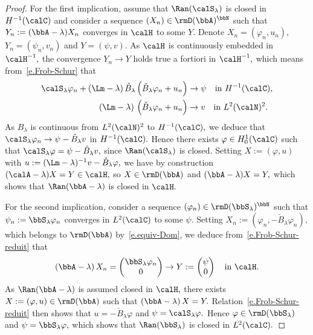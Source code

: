 \begin{proof}
For the first implication, assume that $\Ran(\calS_\lambda)$ is closed in $H^{-1}(\calC)$ and consider a sequence $(X_n) \in \rmD(\bbA)^\bbN$ such that $Y_n := (\bbA-\lambda) X_n$ converges in $\calH$ to some $Y.$ Denote $X_n = (\varphi_n,u_n),$ $Y_n = (\psi_n,v_n)$ and $Y = (\psi,v).$ As $\calH$ is continuously embedded in $\calH^{-1},$ the convergence $Y_n \to Y$ holds true a fortiori in $\calH^{-1},$ which means from~\eqref{e.Frob-Schur} that
\begin{align*}
\calS_\lambda \varphi_n + (\Lm - \lambda)\, \hat{B}_\lambda\left(\check{B}_\lambda \varphi_n + u_n\right) & \to \psi \quad\text{in } H^{-1}(\calC), \\
(\Lm - \lambda)\, \left(\check{B}_\lambda \varphi_n + u_n\right) & \to v \quad\text{in } L^2(\calN)^2.
\end{align*}
As $\hat{B}_\lambda$ is continuous from $L^2(\calN)^2$ to $H^{-1}(\calC),$ we deduce that $\calS_\lambda \varphi_n \to \psi - \hat{B}_\lambda v$ in $H^{-1}(\calC).$ Hence there exists $\varphi \in H^1_0(\calC)$ such that $\calS_\lambda \varphi = \psi - \hat{B}_\lambda v,$ since $\Ran(\calS_\lambda)$ is closed. Setting $X := (\varphi,u)$ with $u := (\Lm - \lambda)^{-1} v - \check{B}_\lambda \varphi,$ we have by construction $(\calA - \lambda)X = Y \in \calH,$ so $X \in \rmD(\bbA)$ and $(\bbA - \lambda)X = Y,$ which shows that $\Ran(\bbA - \lambda)$ is closed in $\calH.$

For the second implication, consider a sequence $(\varphi_n) \in \rmD(\bbS_\lambda)^\bbN$ such that\linebreak$\psi_n := \bbS_\lambda \varphi_n$ converges in $L^2(\calC)$ to some $\psi.$ Setting $X_n := (\varphi_n,-\check{B}_\lambda \varphi_n),$ which belongs to $\rmD(\bbA)$ by~\eqref{e.equiv-Dom}, we deduce from~\eqref{e.Frob-Schur-reduit} that
\[
(\bbA - \lambda) \, X_n =
\begin{pmatrix} \bbS_\lambda \varphi_n \\ 0
\end{pmatrix}
\to Y :=
\begin{pmatrix} \psi \\ 0
\end{pmatrix}
\quad\text{in }\calH.
\]
As $\Ran(\bbA - \lambda)$ is assumed closed in $\calH,$ there exists $X := (\varphi,u) \in \rmD(\bbA)$ such that $(\bbA - \lambda) \, X = Y.$ Relation~\eqref{e.Frob-Schur-reduit} then shows that $u = -\check{B}_\lambda \varphi$ and $\psi = \calS_\lambda \varphi.$ Hence $\varphi \in \rmD(\bbS_\lambda)$ and $\psi = \bbS_\lambda \varphi,$ which shows that $\Ran(\bbS_\lambda)$ is closed in $L^2(\calC).$
\end{proof}



